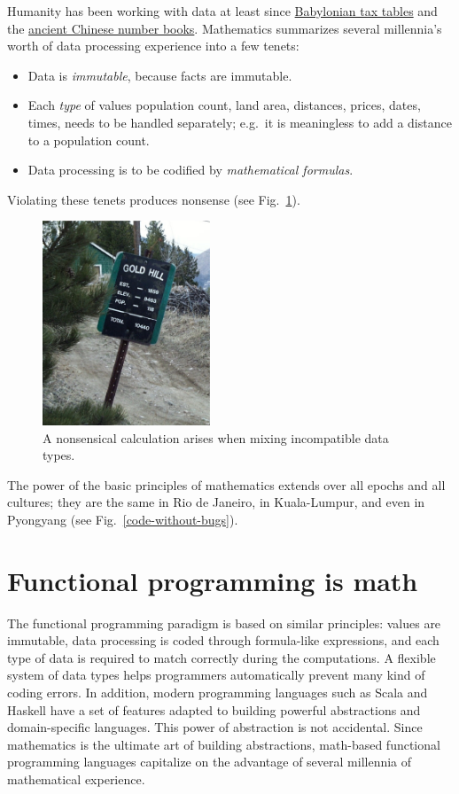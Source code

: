 Humanity has been working with data at least since \href{https://www.nytimes.com/2017/08/29/science/trigonometry-babylonian-tablet.html\%3Fmcubz\%3D0}{Babylonian tax tables}
and the \href{http://quatr.us/china/science/chinamath.htm}{ancient Chinese number books}.
Mathematics summarizes several millennia's worth of data processing
experience into a few tenets:
\begin{itemize}
\item Data is \emph{immutable}, because facts are immutable. 
\item Each \emph{type} of values \textendash{} population count, land area,
distances, prices, dates, times, \textendash{} needs to be handled
separately; e.g.\ it is meaningless to add a distance to a population
count.
\item Data processing is to be codified by \emph{mathematical formulas}. 
\end{itemize}
Violating these tenets produces nonsense (see Fig.\ \ref{nonsense-math}).
\begin{figure}
\begin{centering}
\includegraphics[width=5cm]{type-error}
\par\end{centering}
\caption{A nonsensical calculation arises when mixing incompatible data types.}
\label{nonsense-math}
\end{figure}

The power of the basic principles of mathematics extends over all
epochs and all cultures; they are the same in Rio de Janeiro, in Kuala-Lumpur,
and even in Pyongyang (see Fig.\ \ref{code-without-bugs}).

\section{Functional programming is math}

The functional programming paradigm is based on similar principles:
values are immutable, data processing is coded through formula-like
expressions, and each type of data is required to match correctly
during the computations. A flexible system of data types helps programmers
automatically prevent many kind of coding errors. In addition, modern
programming languages such as Scala and Haskell have a set of features
adapted to building powerful abstractions and domain-specific languages.
This power of abstraction is not accidental. Since mathematics is
the ultimate art of building abstractions, math-based functional programming
languages capitalize on the advantage of several millennia of mathematical
experience.

